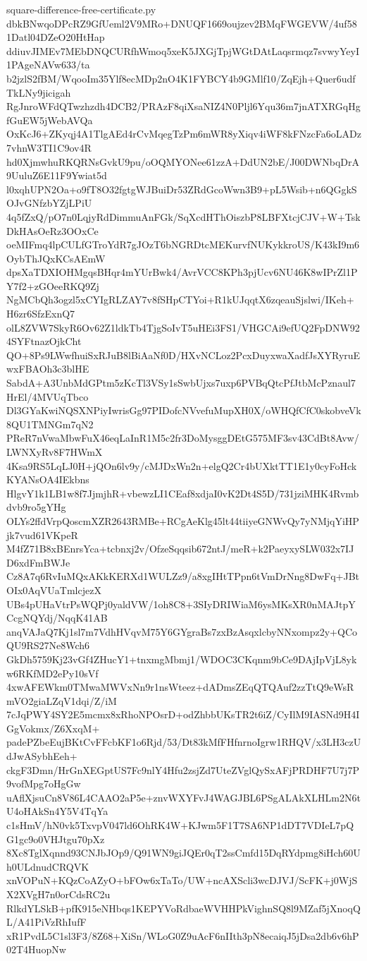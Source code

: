 \documentclass[11pt]{article}
\theoremstyle{definition}
\theoremstyle{remark}
\begin{document}
\begin{filecontents*}[overwrite]{square-difference-free-certificate.py}
dbkBNwqoDPcRZ9GfUeml2V9MRo+DNUQF1669oujzev2BMqFWGEVW/4uf581Datl04DZeO20HtHap
ddiuvJIMEv7MEbDNQCURfhWmoq5xeK5JXGjTpjWGtDAtLaqsrmqz7svwyYeyI1PAgeNAVw633/ta
b2jzlS2fBM/WqooIm35Ylf8ecMDp2nO4K1FYBCY4b9GMlf10/ZqEjh+Quer6udfTkLNy9jicigah
RgJnroWFdQTwzhzdh4DCB2/PRAzF8qiXsaNIZ4N0Pljl6Yqu36m7jnATXRGqHgfGuEW5jWebAVQa
OxKcJ6+ZKyqj4A1TlgAEd4rCvMqegTzPm6mWR8yXiqv4iWF8kFNzcFa6oLADz7vhnW3TI1C9ov4R
hd0XjmwhuRKQRNsGvkU9pu/oOQMYONee61zzA+DdUN2bE/J00DWNbqDrA9UuluZ6E11F9Ywiat5d
l0xqhUPN2Oa+o9fT8O32fgtgWJBuiDr53ZRdGcoWwn3B9+pL5Wsib+n6QGgkSOJvGNfzbYZjLPiU
4q5fZxQ/pO7n0LqjyRdDimmuAnFGk/SqXcdHThOiszbP8LBFXtcjCJV+W+TskDkHAsOeRz3OOxCe
oeMIFmq4lpCULfGTroYdR7gJOzT6bNGRDtcMEKurvfNUKykkroUS/K43kI9m6OybThJQxKCsAEmW
dpsXaTDXIOHMgqsBHqr4mYUrBwk4/AvrVCC8KPh3pjUcv6NU46K8wIPrZl1PY7f2+zGOeeRKQ9Zj
NgMCbQh3ogzl5xCYIgRLZAY7v8fSHpCTYoi+R1kUJqqtX6zqeauSjslwi/IKeh+H6zr6SfzExnQ7
olL8ZVW7SkyR6Ov62Z1ldkTb4TjgSoIvT5uHEi3FS1/VHGCAi9efUQ2FpDNW924SYFtnazOjkCht
QO+8Ps9LWwfhuiSxRJuB8lBiAaNf0D/HXvNCLoz2PcxDuyxwaXadfJsXYRyruEwxFBAOh3c3blHE
SabdA+A3UnbMdGPtm5zKcTl3VSy1sSwbUjxs7uxp6PVBqQtcPfJtbMcPznaul7HrEl/4MVUqTbco
Dl3GYaKwiNQSXNPiyIwrisGg97PIDofcNVvefuMupXH0X/oWHQfCfC0skobveVk8QU1TMNGm7qN2
PReR7nVwaMbwFuX46eqLaInR1M5c2fr3DoMysggDEtG575MF3sv43CdBt8Avw/LWNXyRv8F7HWmX
4Ksa9RS5LqLJ0H+jQOn6lv9y/cMJDxWn2n+elgQ2Cr4bUXktTT1E1y0cyFoHckKYANsOA4IEkbns
HlgvY1k1LB1w8f7JjmjhR+vbewzLI1CEaf8xdjaI0vK2Dt4S5D/731jziMHK4Rvmbdvb9ro5gYHg
OLYs2ffdVrpQoscmXZR2643RMBe+RCgAeKlg45lt44tiiyeGNWvQy7yNMjqYiHPjk7vud61VKpeR
M4fZ71B8xBEnrsYca+tcbnxj2v/OfzeSqqsib672ntJ/meR+k2PaeyxySLW032x7IJD6xdFmBWJe
Cz8A7q6RvIuMQxAKkKERXd1WULZz9/a8xgIHtTPpn6tVmDrNng8DwFq+JBtOIx0AqVUaTmlcjezX
UBs4pUHaVtrPsWQPj0yaldVW/1oh8C8+3SIyDRIWiaM6ysMKsXR0nMAJtpYCcgNQYdj/NqqK41AB
anqVAJaQ7Kj1sl7m7VdhHVqvM75Y6GYgraBs7zxBzAsqxlcbyNNxompz2y+QCoQU9RS27Ne8Wch6
GkDh5759Kj23vGf4ZHucY1+tnxmgMbmj1/WDOC3CKqnm9bCe9DAjIpVjL8ykw6RKfMD2ePy10sVf
4xwAFEWkm0TMwaMWVxNn9r1nsWteez+dADmsZEqQTQAuf2zzTtQ9eWsRmVO2giaLZqV1dqi/Z/iM
7cJqPWY4SY2E5mcmx8xRhoNPOsrD+odZhbbUKsTR2t6iZ/CyIlM9IASNd9H4IGgVokmx/Z6XxqM+
padePZbeEujBKtCvFFcbKF1o6Rjd/53/Dt83kMfFHfnrnoIgrw1RHQV/x3LH3czUdJwASybhEeh+
ckgF3Dmn/HrGnXEGptUS7Fc9nlY4Hfu2zsjZd7UteZVglQySxAFjPRDHF7U7j7P9vofMpg7oHgGw
uAflXjsuCn8V86L4CAAO2aP5e+znvWXYFvJ4WAGJBL6PSgALAkXLHLm2N6tU4oHAkSn4Y5V4TqYa
c1sHmV/hN0vk5TxvpV047ld6OhRK4W+KJwm5F1T7SA6NP1dDT7VDIeL7pQG1gc9o0VHJtgu70pXz
8Xc8TglXqnnd93CNJbJOp9/Q91WN9giJQEr0qT2ssCmfd15DqRYdpmg8iHch60Uh0ULdnudCRQVK
xnVOPuN+KQzCoAZyO+bFOw6xTaTo/UW+ncAXScli3wcDJVJ/ScFK+j0WjSX2XVgH7n0orCdsRC2u
RlkdYLSkB+pfK915eNHbqs1KEPYVoRdbaeWVHHPkVighnSQ8l9MZaf5jXnoqQL/A41PiVzRhIufF
xR1PvdL5C1sl3F3/8Z68+XiSn/WLoG0Z9uAcF6nIIth3pN8ecaiqJ5jDsa2db6v6hP02T4HuopNw

\end{filecontents*}
\end{document}
